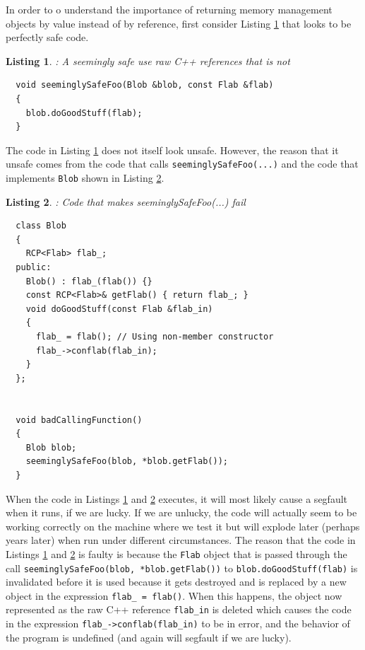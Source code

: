 \documentclass[pdf,ps2pdf,11pt]{SANDreport}
\newtheorem{listing}{Listing}
\begin{document}
In order to o understand the importance of returning memory management
objects by value instead of by reference, first consider Listing
{}\ref{listing:unsafe_raw_C++_reference1} that looks to be perfectly
safe code.

\begin{listing}: A seemingly safe use raw C++ references that is not \\
\label{listing:unsafe_raw_C++_reference1}
{\small\begin{verbatim}
  void seeminglySafeFoo(Blob &blob, const Flab &flab)
  {
    blob.doGoodStuff(flab);
  }
\end{verbatim}}
\end{listing}

The code in Listing {}\ref{listing:unsafe_raw_C++_reference1} does not
itself look unsafe.  However, the reason that it unsafe comes from the
code that calls {}\texttt{seeminglySafeFoo(...)} and the code that
implements {}\texttt{Blob} shown in Listing
{}\ref{listing:unsafe_raw_C++_reference2}.

\begin{listing}: Code that makes seeminglySafeFoo(...) fail\\
\label{listing:unsafe_raw_C++_reference2}
{\small\begin{verbatim}
  class Blob
  {
    RCP<Flab> flab_;
  public:
    Blob() : flab_(flab()) {}
    const RCP<Flab>& getFlab() { return flab_; }
    void doGoodStuff(const Flab &flab_in)
    {
      flab_ = flab(); // Using non-member constructor
      flab_->conflab(flab_in);
    }
  };


  void badCallingFunction()
  {
    Blob blob;
    seeminglySafeFoo(blob, *blob.getFlab());
  }
\end{verbatim}}
\end{listing}

When the code in Listings {}\ref{listing:unsafe_raw_C++_reference1}
and {}\ref{listing:unsafe_raw_C++_reference2} executes, it will most
likely cause a segfault when it runs, if we are lucky.  If we are
unlucky, the code will actually seem to be working correctly on the
machine where we test it but will explode later (perhaps years later)
when run under different circumstances.  The reason that the code in
Listings {}\ref{listing:unsafe_raw_C++_reference1} and
{}\ref{listing:unsafe_raw_C++_reference2} is faulty is because the
{}\texttt{Flab} object that is passed through the call
{}\texttt{seeminglySafeFoo(blob, *blob.getFlab())} to
{}\texttt{blob.doGoodStuff(flab)} is invalidated before it is used
because it gets destroyed and is replaced by a new object in the
expression {}\texttt{flab\_ = flab()}.  When this happens, the object
now represented as the raw C++ reference {}\texttt{flab\_in} is
deleted which causes the code in the expression
{}\texttt{flab\_->conflab(flab\_in)} to be in error, and the behavior
of the program is undefined (and again will segfault if we are lucky).
\end{document}
